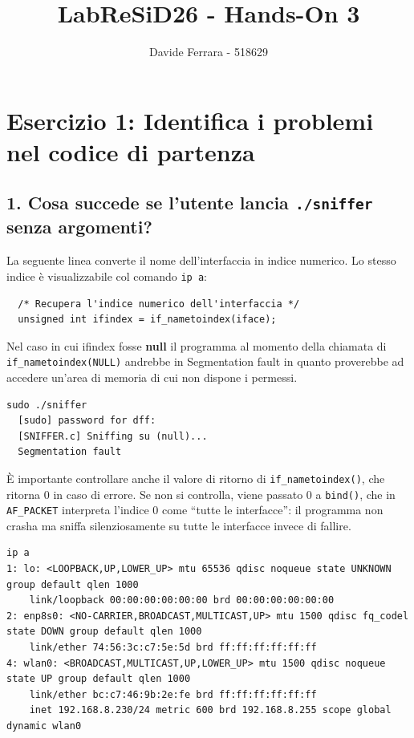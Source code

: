 \documentclass[a4paper,12pt]{article}
\title{LabReSiD26 - Hands-On 3}
\author{Davide Ferrara - 518629}
\date{}
\begin{document}
\maketitle

\section{Esercizio 1: Identifica i problemi nel codice di partenza}

\subsection{1. Cosa succede se l'utente lancia \texttt{./sniffer} senza argomenti?}

La seguente linea converte il nome dell'interfaccia in indice numerico.
Lo stesso indice è visualizzabile col comando \texttt{ip a}:

\begin{lstlisting}
  /* Recupera l'indice numerico dell'interfaccia */
  unsigned int ifindex = if_nametoindex(iface);
\end{lstlisting}

Nel caso in cui ifindex fosse \textbf{null} il programma al momento della
chiamata di \texttt{if\_nametoindex(NULL)} andrebbe in Segmentation fault
in quanto proverebbe ad accedere un'area di memoria di cui non dispone i permessi.

\begin{lstlisting}[language={}]
  sudo ./sniffer
  [sudo] password for dff:
  [SNIFFER.c] Sniffing su (null)...
  Segmentation fault
\end{lstlisting}

È importante controllare anche il valore di ritorno di \texttt{if\_nametoindex()},
che ritorna 0 in caso di errore.
Se non si controlla, viene passato 0 a \texttt{bind()}, che in
\texttt{AF\_PACKET} interpreta l'indice 0 come ``tutte le interfacce'': il programma non
crasha ma sniffa silenziosamente su tutte le interfacce invece di fallire.

\begin{lstlisting}[language={}]
ip a
1: lo: <LOOPBACK,UP,LOWER_UP> mtu 65536 qdisc noqueue state UNKNOWN group default qlen 1000
    link/loopback 00:00:00:00:00:00 brd 00:00:00:00:00:00
2: enp8s0: <NO-CARRIER,BROADCAST,MULTICAST,UP> mtu 1500 qdisc fq_codel state DOWN group default qlen 1000
    link/ether 74:56:3c:c7:5e:5d brd ff:ff:ff:ff:ff:ff
4: wlan0: <BROADCAST,MULTICAST,UP,LOWER_UP> mtu 1500 qdisc noqueue state UP group default qlen 1000
    link/ether bc:c7:46:9b:2e:fe brd ff:ff:ff:ff:ff:ff
    inet 192.168.8.230/24 metric 600 brd 192.168.8.255 scope global dynamic wlan0
\end{lstlisting}
\end{document}
